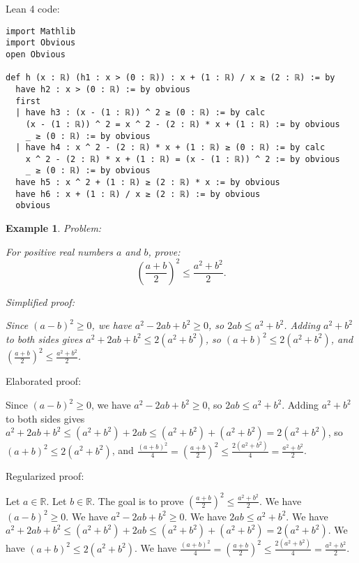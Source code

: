 \documentclass{article}
\newtheorem{example}{Example}
\begin{document}
Lean 4 code:
\begin{tcolorbox}[colback=white!10, width=\linewidth]
\begin{lstlisting}[language=Lean4]
import Mathlib
import Obvious
open Obvious

def h (x : ℝ) (h1 : x > (0 : ℝ)) : x + (1 : ℝ) / x ≥ (2 : ℝ) := by
  have h2 : x > (0 : ℝ) := by obvious
  first
  | have h3 : (x - (1 : ℝ)) ^ 2 ≥ (0 : ℝ) := by calc
    (x - (1 : ℝ)) ^ 2 = x ^ 2 - (2 : ℝ) * x + (1 : ℝ) := by obvious
    _ ≥ (0 : ℝ) := by obvious
  | have h4 : x ^ 2 - (2 : ℝ) * x + (1 : ℝ) ≥ (0 : ℝ) := by calc
    x ^ 2 - (2 : ℝ) * x + (1 : ℝ) = (x - (1 : ℝ)) ^ 2 := by obvious
    _ ≥ (0 : ℝ) := by obvious
  have h5 : x ^ 2 + (1 : ℝ) ≥ (2 : ℝ) * x := by obvious
  have h6 : x + (1 : ℝ) / x ≥ (2 : ℝ) := by obvious
  obvious

\end{lstlisting}
\end{tcolorbox}


\begin{example}
Problem:
\begin{tcolorbox}[colback=yellow!10, width=\linewidth]
For positive real numbers $a$ and $b$, prove:
    $$\left(\frac{a+b}{2}\right)^2 \leq \frac{a^2+b^2}{2}.$$
\end{tcolorbox}

Simplified proof:
\begin{tcolorbox}[colback=blue!10, width=\linewidth]
Since $(a-b)^2 \ge 0$, we have $a^2 - 2ab + b^2 \ge 0$, so $2ab \leq a^2 + b^2$.
Adding $a^2+b^2$ to both sides gives $a^2 + 2ab + b^2 \leq 2(a^2+b^2)$, so $(a+b)^2 \leq 2(a^2+b^2)$, and $\left(\frac{a+b}{2}\right)^2 \leq \frac{a^2+b^2}{2}$.
\end{tcolorbox}
\end{example}

Elaborated proof:
\begin{tcolorbox}[colback=green!10, width=\linewidth]
Since $(a-b)^2 \ge 0$, we have $a^2 - 2ab + b^2 \ge 0$, so $2ab \leq a^2 + b^2$.
Adding $a^2+b^2$ to both sides gives $a^2 + 2ab + b^2 \leq (a^2 + b^2) + 2ab \leq (a^2+b^2) + (a^2+b^2) = 2(a^2+b^2)$, so $(a+b)^2 \leq 2(a^2+b^2)$, and $\frac{(a+b)^2}{4} = \left(\frac{a+b}{2}\right)^2 \leq \frac{2(a^2+b^2)}{4} = \frac{a^2+b^2}{2}$.
\end{tcolorbox}

Regularized proof:
\begin{tcolorbox}[colback=red!10, width=\linewidth]
Let $a\in\mathbb{R}$.
Let $b\in\mathbb{R}$.
The goal is to prove ${\left(\frac{a+b}{2}\right)}^2 \leq \frac{a^2+b^2}{2}$.
We have ${(a-b)}^2 \ge 0$.
We have $a^2 - 2ab + b^2 \ge 0$.
We have $2ab \leq a^2 + b^2$.
We have $a^2 + 2ab + b^2 \leq (a^2 + b^2) + 2ab \leq (a^2+b^2) + (a^2+b^2) = 2(a^2+b^2)$.
We have ${(a+b)}^2 \leq 2(a^2+b^2)$.
We have $\frac{{(a+b)}^2}{4} = {\left(\frac{a+b}{2}\right)}^2 \leq \frac{2(a^2+b^2)}{4} = \frac{a^2+b^2}{2}$.
\end{tcolorbox}
\end{document}
